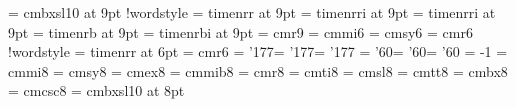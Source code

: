 \font\ninebs = cmbxsl10 at 9pt  %
\if!wordstyle
    \font\ninerm = timenrr  at 9pt
    \font\ninesl = timenrri at 9pt
    \font\nineit = timenrri at 9pt
    \font\ninebf = timenrb  at 9pt
    \font\ninebs = timenrbi at 9pt
    \font\nineot = cmr9\fi
\font\sixi  = cmmi6            %
\font\sixsy = cmsy6            %
\font\sixrm = cmr6             %
\if!wordstyle
    \font\sixrm = timenrr at 6pt
    \font\sixot = cmr6\fi
\skewchar\ninei = '177\skewchar\sixi = '177\skewchar\fivei = '177
\skewchar\ninesy = '60\skewchar\sixsy = '60\skewchar\fivesy = '60
\hyphenchar\ninett = -1
\def\ninepoint{%
    \def\rm{\fam0\ninerm}%
        \textfont0 = \ninerm\scriptfont0 = \sixrm\scriptscriptfont0 = \fiverm%
    \textfont1 = \ninei \scriptfont1 = \sixi  \scriptscriptfont1 = \fivei%
    \textfont2 = \ninesy\scriptfont2 = \sixsy \scriptscriptfont2 = \fivesy%
    \textfont3 = \nineex\scriptfont3 = \nineex\scriptscriptfont3 = \nineex%
    \def\it{\fam\itfam\nineit}\textfont\itfam = \nineit%
    \def\sl{\fam\slfam\ninesl}\textfont\slfam = \ninesl%
    \def\tt{\fam\ttfam\ninett}\textfont\ttfam = \ninett%
    \def\bf{\fam\bffam\ninebf}\textfont\bffam = \ninebf%
    \def\sc{\fam\scfam\ninesc}\textfont\scfam = \ninesc%
    \def\bs{\fam\bsfam\ninebs}\textfont\bsfam = \ninebs%
    \if!wordstyle
        \def\ot{\fam\otfam\nineot}%
            \textfont\otfam = \nineot%
            \scriptfont\otfam = \sixot \scriptscriptfont\otfam = \fiveot\fi%
    \tt\ttglue = .5em plus.25em minus.15em%
    \normalbaselineskip = 12pt
    \setbox\strutbox = \hbox{\vrule height8pt depth3pt width0pt}%
    \normalbaselines\rm}
%
\font\eighti  = cmmi8            %
\font\eightsy = cmsy8            %
\font\eightex = cmex8            %
\font\eightbi = cmmib8           %
\font\eightrm = cmr8             %
\font\eightit = cmti8            %
\font\eightsl = cmsl8            %
\font\eighttt = cmtt8            %
\font\eightbf = cmbx8            %
\font\eightsc = cmcsc8           %
\font\eightbs = cmbxsl10 at 8pt  %
